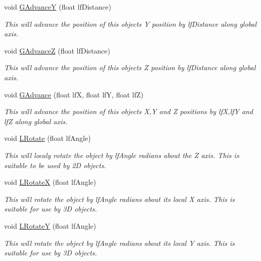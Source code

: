 \begin{DoxyCompactItemize}
void \hyperlink{classc_camera_matrix4_a7cb5d64085acdcc74dcad1e965a52b3b}{GAdvanceY} (float lfDistance)
\begin{DoxyCompactList}\small\item\em This will advance the position of this objects Y position by lfDistance along global axis. \item\end{DoxyCompactList}\item 
void \hyperlink{classc_camera_matrix4_afd68814e78dd2ffaec2f9bc4289aca36}{GAdvanceZ} (float lfDistance)
\begin{DoxyCompactList}\small\item\em This will advance the position of this objects Z position by lfDistance along global axis. \item\end{DoxyCompactList}\item 
void \hyperlink{classc_camera_matrix4_a342b888f43a65b6c4a14b818c2519157}{GAdvance} (float lfX, float lfY, float lfZ)
\begin{DoxyCompactList}\small\item\em This will advance the position of this objects X,Y and Z positions by lfX,lfY and lfZ along global axis. \item\end{DoxyCompactList}\item 
void \hyperlink{classc_camera_matrix4_ab9ea2ea9b429824586d4fa74e709426e}{LRotate} (float lfAngle)
\begin{DoxyCompactList}\small\item\em This will localy rotate the object by lfAngle radians about the Z axis. This is suitable to be used by 2D objects. \item\end{DoxyCompactList}\item 
void \hyperlink{classc_camera_matrix4_a08ffa3e8e4622821ba80aaa51300e645}{LRotateX} (float lfAngle)
\begin{DoxyCompactList}\small\item\em This will rotate the object by lfAngle radians about its local X axis. This is suitable for use by 3D objects. \item\end{DoxyCompactList}\item 
void \hyperlink{classc_camera_matrix4_a369f1a97e289850afffd03302bb5bd0f}{LRotateY} (float lfAngle)
\begin{DoxyCompactList}\small\item\em This will rotate the object by lfAngle radians about its local Y axis. This is suitable for use by 3D objects. \item\end{DoxyCompactList}\item 

\end{DoxyCompactItemize}
